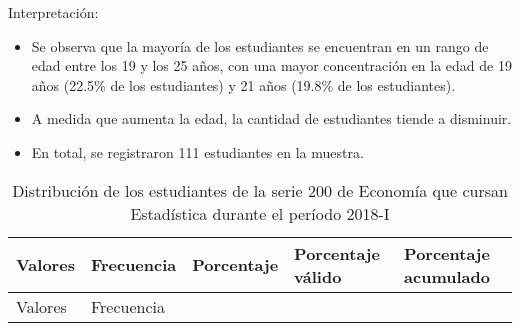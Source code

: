 \documentclass[
  jou,
  floatsintext,
  longtable,
  a4paper,
  nolmodern,
  notxfonts,
  notimes,
  colorlinks=true,linkcolor=blue,citecolor=blue,urlcolor=blue]{apa7}
\providecommand{\tightlist}{%
  \setlength{\itemsep}{0pt}\setlength{\parskip}{0pt}}
\begin{document}
Interpretación:

\begin{itemize}
\tightlist
\item
  Se observa que la mayoría de los estudiantes se encuentran en un rango
  de edad entre los 19 y los 25 años, con una mayor concentración en la
  edad de 19 años (22.5\% de los estudiantes) y 21 años (19.8\% de los
  estudiantes).
\item
  A medida que aumenta la edad, la cantidad de estudiantes tiende a
  disminuir.
\item
  En total, se registraron 111 estudiantes en la muestra.
\end{itemize}

\begin{ThreePartTable}

\begin{longtable}[]{@{}
  >{\centering\arraybackslash}p{}
  >{\centering\arraybackslash}p{}
  >{\centering\arraybackslash}p{}
  >{\centering\arraybackslash}p{}
  >{\centering\arraybackslash}p{}@{}}
\caption{Distribución de los estudiantes de la serie 200 de Economía que
cursan Estadística durante el período
2018-I}\label{tbl-2}\tabularnewline
\toprule\noalign{}
\begin{minipage}[b]{\linewidth}\centering
Valores
\end{minipage} & \begin{minipage}[b]{\linewidth}\centering
Frecuencia
\end{minipage} & \begin{minipage}[b]{\linewidth}\centering
Porcentaje
\end{minipage} & \begin{minipage}[b]{\linewidth}\centering
Porcentaje válido
\end{minipage} & \begin{minipage}[b]{\linewidth}\centering
Porcentaje acumulado
\end{minipage} \\
\midrule\noalign{}
\endfirsthead
\toprule\noalign{}
\begin{minipage}[b]{\linewidth}\centering
Valores
\end{minipage} & \begin{minipage}[b]{\linewidth}\centering
Frecuencia
\end{minipage} & \begin{minipage}[b]{\linewidth}\centering

\end{minipage}
\end{longtable}
\end{ThreePartTable}
\end{document}
